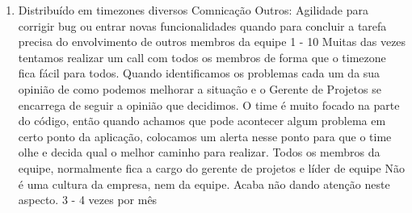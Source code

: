 \begin{enumerate}
	\item
	\begin{respostas3}
		{Distribuído em timezones diversos}
		{Comnicação \newline Outros: Agilidade para corrigir bug ou entrar novas funcionalidades quando para concluir a tarefa precisa do envolvimento de outros membros da equipe}
		{1 - 10}
		{Muitas das vezes tentamos realizar um call com todos os membros de forma que o timezone fica fácil para todos. Quando identificamos os problemas cada um da sua opinião de como podemos melhorar a situação e o Gerente de Projetos se encarrega de seguir a opinião que decidimos.}
		{O time é muito focado na parte do código, então quando achamos que pode acontecer algum problema em certo ponto da aplicação, colocamos um alerta nesse ponto para que o time olhe e decida qual o melhor caminho para realizar.}
		{Todos os membros da equipe, normalmente fica a cargo do gerente de projetos e líder de equipe}
		{Não é uma cultura da empresa, nem da equipe. Acaba não dando atenção neste aspecto.}
		{3 - 4 vezes por mês}
	\end{respostas3}
\end{enumerate}